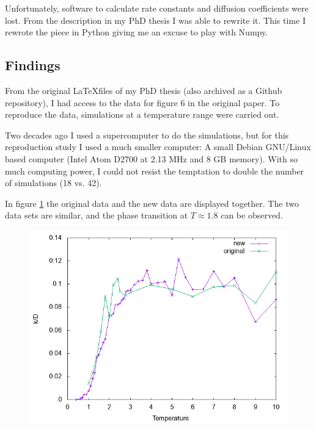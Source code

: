 Unfortunately, software to calculate rate constants and diffusion coefficients were lost.
From the description in my PhD thesis \supercite{Geisshirt:PhD} I was able to rewrite it.
This time I rewrote the piece in Python giving me an excuse to play with Numpy.

\subsection{Findings}

From the original \LaTeX files of my PhD thesis (also archived as a Github repository),
I had access to the data for figure 6 in the original paper. To reproduce the data,
simulations at a temperature range were carried out.

Two decades ago I used a supercomputer to do the simulations, but for this
reproduction study I used a much smaller computer: A small Debian GNU/Linux
based computer (Intel Atom D2700 at 2.13 MHz and 8 GB memory). With so much
computing power, I could not resist the temptation to double the
number of simulations (18 vs. 42).

In figure \ref{kD} the original data and the new data are displayed together.
The two data sets are similar, and the phase transition at $T \approx 1.8$
can be observed.


\begin{figure}
    \label{kD}
    \includegraphics{kD.png}
\end{figure}
